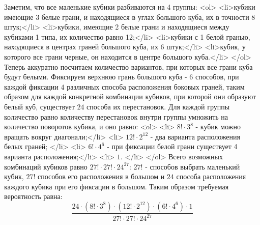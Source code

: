 Заметим, что все маленькие кубики разбиваются на 4 группы:
<ol>
 <li>кубики имеющие 3 белые грани, и находящиеся в углах большого куба, их в точности 8 штук;</li>
 <li>кубики, имеющие 2 белые грани и находящиеся между кубиками 1 типа, их количество равно 12;</li>
 <li>кубики с 1 белой гранью, находящиеся в центрах граней большого куба, их 6 штук;</li>
 <li>кубик, у которого все грани черные, он находится в центре большого куба.</li>
</ol>
Теперь аккуратно посчитаем количество вариантов, при которых все грани куба будут белыми. Фиксируем верхнюю грань большого куба - $6$ способов, при каждой фиксации $4$ различных способа расположения боковых граней, таким образом для каждой конкретной комбинации кубиков, при которой они образуют белый куб, существует $24$ способа их перестановок. Для каждой группы количество равно количеству перестановок внутри группы умножить на количество поворотов кубика, и оно равно:
<ol>
 <li> $8!\cdot3^8$ - кубик можно вращать вокруг диагонали;</li>
 <li> $12!\cdot2^{12}$ - два варианта расположения белых граней; </li>
 <li> $6!\cdot4^6$ - при фиксации белой грани существует 4 варианта расположения;</li>
 <li> $1$. </li>
</ol>
Всего возможных комбинаций кубиков равно $27!\cdot27!\cdot{24}^{27}$: $27!$ - способов выбрать маленький кубик, $27!$ способов его расположения в большом и $24$ способа расположения каждого кубика при его фиксации в большом.
Таким образом требуемая вероятность равна: $$\frac{24\cdot (8!\cdot3^8) \cdot (12!\cdot2^{12}) \cdot (6!\cdot4^6) \cdot 1}{27!\cdot27!\cdot{24}^{27}}$$
